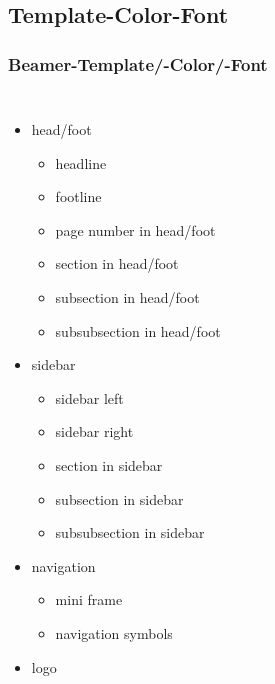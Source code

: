 \documentclass[11pt,pdf,aspectratio=43]{beamer}
\begin{document}
\subsection{Template-Color-Font}
\begin{frame}[allowframebreaks]
    \frametitle{Beamer-Template/-Color/-Font}

    \begin{columns}[t]
	    \begin{itemize}
		\item head/foot
		    \begin{itemize}
			\item headline
			\item footline
			\item page number in head/foot
			\item section in head/foot
			\item subsection in head/foot
			\item subsubsection in head/foot
		    \end{itemize}
		\item sidebar
		    \begin{itemize}
			\item sidebar left
			\item sidebar right
			\item section in sidebar
			\item subsection in sidebar
			\item subsubsection in sidebar
		    \end{itemize}
		\item navigation
		    \begin{itemize}
			\item mini frame
			\item navigation symbols
		    \end{itemize}
		\item logo
		\end{itemize}


\end{columns}
\end{frame}
\end{document}
